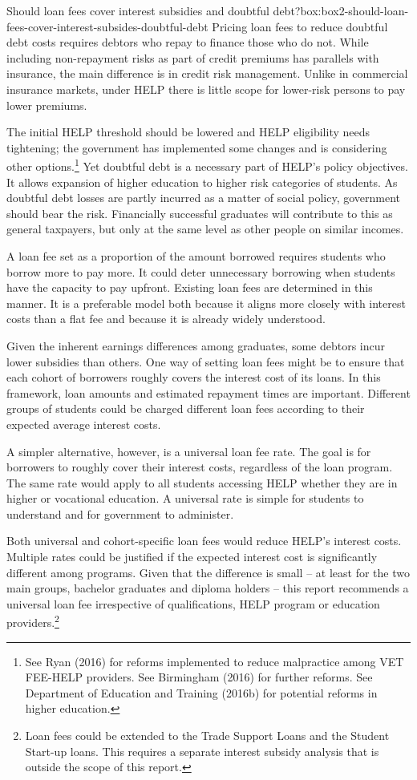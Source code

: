 \documentclass[embargoed]{grattan}
\begin{document}
\begin{bigbox*}{Should loan fees cover interest subsidies and doubtful debt?}{box:box2-should-loan-fees-cover-interest-subsides-doubtful-debt}
Pricing loan fees to reduce doubtful debt costs requires debtors who repay to finance those who do not. While including non-repayment risks as part of credit premiums has parallels with insurance, the main difference is in credit risk management. Unlike in commercial insurance markets, under HELP there is little scope for lower-risk persons to pay lower premiums.

The initial HELP threshold should be lowered and HELP eligibility needs tightening; the government has implemented some changes and is considering other options.\footnote{See Ryan (2016) for reforms implemented to reduce malpractice among VET FEE-HELP providers. See Birmingham (2016) for further reforms. See Department of Education and Training (2016b) for potential reforms in higher education.} Yet doubtful debt is a necessary part of HELP's policy objectives. It allows expansion of higher education to higher risk categories of students. As doubtful debt losses are partly incurred as a matter of social policy, government should bear the risk. Financially successful graduates will contribute to this as general taxpayers, but only at the same level as other people on similar incomes.
\end{bigbox*}

A loan fee set as a proportion of the amount borrowed requires students who borrow more to pay more. It could deter unnecessary borrowing when students have the capacity to pay upfront. Existing loan fees are determined in this manner. It is a preferable model both because it aligns more closely with interest costs than a flat fee and because it is already widely understood.

Given the inherent earnings differences among graduates, some debtors incur lower subsidies than others. One way of setting loan fees might be to ensure that each cohort of borrowers roughly covers the interest cost of its loans. In this framework, loan amounts and estimated repayment times are important. Different groups of students could be charged different loan fees according to their expected average interest costs.

A simpler alternative, however, is a universal loan fee rate. The goal is for borrowers to roughly cover their interest costs, regardless of the loan program. The same rate would apply to all students accessing HELP whether they are in higher or vocational education. A universal rate is simple for students to understand and for government to administer.

Both universal and cohort-specific loan fees would reduce HELP's interest costs. Multiple rates could be justified if the expected interest cost is significantly different among programs. Given that the difference is small -- at least for the two main groups, bachelor graduates and diploma holders -- this report recommends a universal loan fee irrespective of qualifications, HELP program or education providers.\footnote{Loan fees could be extended to the Trade Support Loans and the Student Start-up loans. This requires a separate interest subsidy analysis that is outside the scope of this report.}
\end{document}
